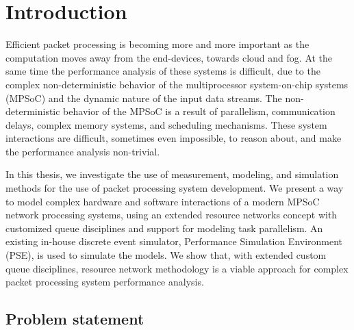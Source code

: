 \chapter{Introduction}
\label{chapter:intro}
Efficient packet processing is becoming more and more important as the computation moves away from the end-devices, towards cloud and fog. At the same time the performance analysis of these systems is difficult, due to the complex non-deterministic behavior of the multiprocessor system-on-chip systems (MPSoC) and the dynamic nature of the input data streams. The non-deterministic behavior of the MPSoC is a result of parallelism, communication delays, complex memory systems, and scheduling mechanisms. These system interactions are difficult, sometimes even impossible, to reason about, and make the performance analysis non-trivial.

In this thesis, we investigate the use of measurement, modeling, and simulation methods for the use of packet processing system development. We present a way to model complex hardware and software interactions of a modern MPSoC network processing systems, using an extended resource networks concept with customized queue disciplines and support for modeling task parallelism. An existing in-house discrete event simulator, Performance Simulation Environment (PSE), is used to simulate the models. We show that, with extended custom queue disciplines, resource network methodology is a viable approach for complex packet processing system performance analysis.



\section{Problem statement}



